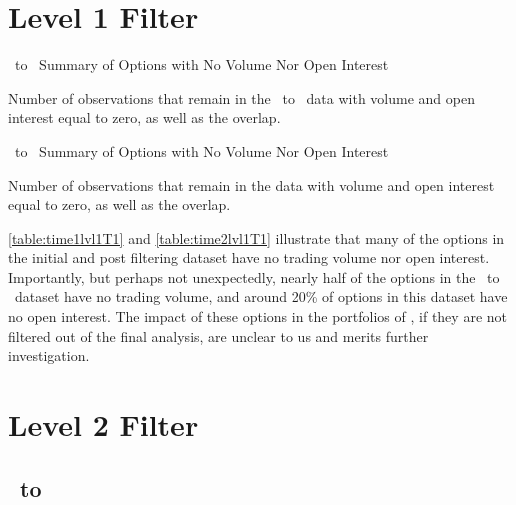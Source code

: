 \begin{appendix}
\newpage

\section{Level 1 Filter}\label{app:lvl1}


\begin{table}[ht]

\centering
{}
\caption{\STARTONE\ to \ENDONE\ Summary of Options with No Volume Nor Open Interest}



\caption*{
  Number of observations that remain in the \STARTONE\ to \ENDONE\ data with volume and open interest equal to zero, as well as the overlap. 
}
\label{table:time1lvl1T1}
\end{table}


\begin{table}[ht]

\centering
{}
\caption{\STARTTWO\ to \ENDONE\ Summary of Options with No Volume Nor Open Interest}



\caption*{
  Number of observations that remain in the data with volume and open interest equal to zero, as well as the overlap. 
}
\label{table:time2lvl1T1}
\end{table}

\autoref{table:time1lvl1T1} and \autoref{table:time2lvl1T1} illustrate that many of the options in the initial and post filtering dataset have no trading volume nor open interest. Importantly, but perhaps not unexpectedly, nearly half of the options in the \STARTONE\ to \ENDONE\ dataset have no trading volume, and around 20\% of options in this dataset have no open interest. The impact of these options in the portfolios of \citet{constantinides2013}, if they are not filtered out of the final analysis, are unclear to us and merits further investigation. 

\newpage

\section{Level 2 Filter}\label{app:lvl2}
\subsection{\STARTONE\ to \ENDONE }


\end{appendix}
